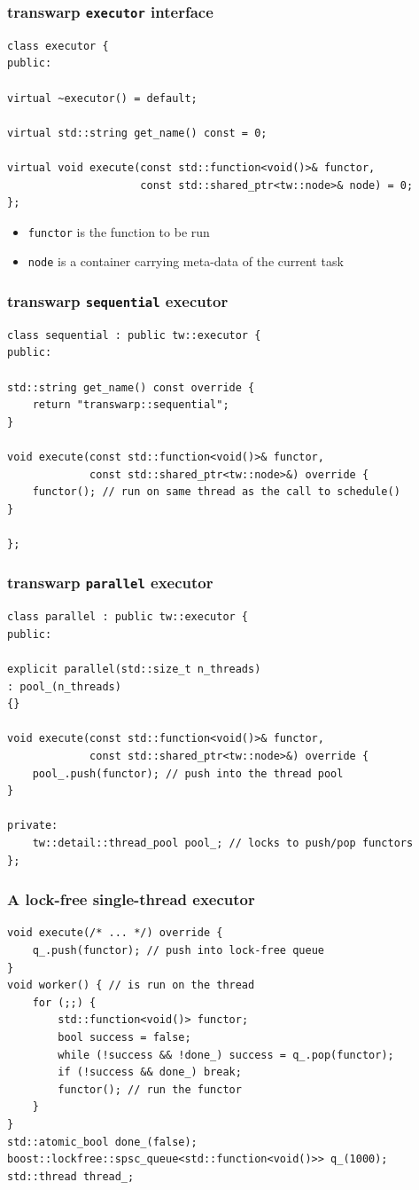 \documentclass[12pt,aspectratio=169]{beamer}
\begin{document}
\begin{frame}[fragile]
\frametitle{transwarp \lstinline{executor} interface}
\begin{lstlisting}
class executor {
public:

virtual ~executor() = default;

virtual std::string get_name() const = 0;

virtual void execute(const std::function<void()>& functor, 
                     const std::shared_ptr<tw::node>& node) = 0;
};
\end{lstlisting}
\begin{itemize}
\item \lstinline{functor} is the function to be run
\item \lstinline{node} is a container carrying meta-data of the current task
\end{itemize}
\end{frame}

\begin{frame}[fragile]
\frametitle{transwarp \lstinline{sequential} executor}
\begin{lstlisting}
class sequential : public tw::executor {
public:

std::string get_name() const override {
    return "transwarp::sequential";
}

void execute(const std::function<void()>& functor, 
             const std::shared_ptr<tw::node>&) override {
    functor(); // run on same thread as the call to schedule()
}

};
\end{lstlisting}
\end{frame}

\begin{frame}[fragile]
\frametitle{transwarp \lstinline{parallel} executor}
\begin{lstlisting}
class parallel : public tw::executor {
public:

explicit parallel(std::size_t n_threads)
: pool_(n_threads)
{}

void execute(const std::function<void()>& functor, 
             const std::shared_ptr<tw::node>&) override {
    pool_.push(functor); // push into the thread pool
}

private:
    tw::detail::thread_pool pool_; // locks to push/pop functors
};
\end{lstlisting}
\end{frame}

\begin{frame}[fragile]
\frametitle{A lock-free single-thread executor}
\begin{lstlisting}
void execute(/* ... */) override {
    q_.push(functor); // push into lock-free queue
}
void worker() { // is run on the thread
    for (;;) {
        std::function<void()> functor;
        bool success = false;
        while (!success && !done_) success = q_.pop(functor);
        if (!success && done_) break;
        functor(); // run the functor
    }
}
std::atomic_bool done_(false);
boost::lockfree::spsc_queue<std::function<void()>> q_(1000);
std::thread thread_;
\end{lstlisting}
\end{frame}
\end{document}
